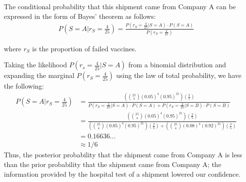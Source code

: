 The conditional probability that this shipment came from Company A can be expressed in the form of Bayes' theorem as follows:\\
\begin{align*}
    P(S=A|r_S=\frac{4}{25}) = \frac{P(r_S=\frac{4}{25}|S=A)\cdot P(S=A)}{P(r_S=\frac{4}{25})}
\end{align*}

where $r_S$ is the proportion of failed vaccines.

Taking the likelihood $P(r_s=\frac{4}{25}|S=A)$ from a binomial distribution and expanding the marginal $P(r_S=\frac{4}{25})$ using the law of total probability, we have the following:
\begin{align*}
    P(S=A|r_S=\frac{4}{25}) &= \frac{(\binom{25}{4}(0.05)^{4}(0.95)^{21})(\frac{2}{5})}{P(r_S=\frac{4}{25}|S=A)\cdot P(S=A)+P(r_S=\frac{4}{25}|S=B)\cdot P(S=B)}\\
    &= \frac{(\binom{25}{4}(0.05)^{4}(0.95)^{21})(\frac{2}{5})}{(\binom{25}{4}(0.05)^{4}(0.95)^{21})(\frac{2}{5})+(\binom{25}{4}(0.08)^{4}(0.92)^{21})(\frac{3}{5})}\\
    &= 0.16636...\\
    &\approx 1/6
\end{align*}
Thus, the posterior probability that the shipment came from Company A is less than the prior probability that the shipment came from Company A; the information provided by the hospital test of a shipment lowered our confidence.
